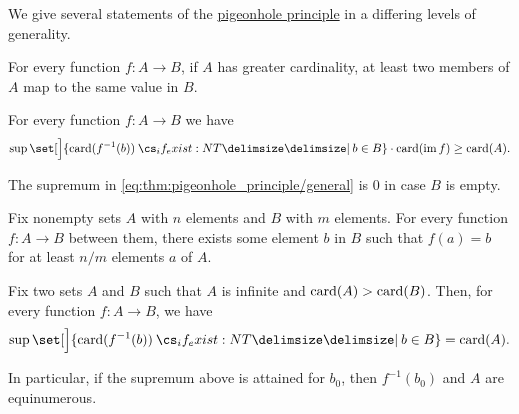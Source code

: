\begin{theorem}\label{thm:pigeonhole_principle}
  We give several statements of the \hyperref[con:pigeonhole_principle]{pigeonhole principle} in a differing levels of generality.

  \begin{thmenum}
     For every function \( f: A \to B \), if \( A \) has greater cardinality, at least two members of \( A \) map to the same value in \( B \).

     For every function \( f: A \to B \) we have
    \begin{equation}\label{eq:thm:pigeonhole_principle/general}
      \sup\set[\Big]{ \card(f^{-1}(b)) \given* b \in B } \cdot \card(\img f) \geq \card(A).
    \end{equation}

    The supremum in \eqref{eq:thm:pigeonhole_principle/general} is \( 0 \) in case \( B \) is empty.

     Fix nonempty  sets \( A \) with \( n \) elements and \( B \) with \( m \) elements. For every function \( f: A \to B \) between them, there exists some element \( b \) in \( B \) such that \( f(a) = b \) for at least \( n / m \) elements \( a \) of \( A \).

     Fix two sets \( A \) and \( B \) such that \( A \) is infinite and \( \operatorname{card}(A) > \operatorname{card}(B) \). Then, for every function \( f: A \to B \), we have
    \begin{equation}\label{eq:thm:pigeonhole_principle/infinitary}
      \sup\set[\Big]{ \card(f^{-1}(b)) \given* b \in B } = \card(A).
    \end{equation}

    In particular, if the supremum above is attained for \( b_0 \), then \( f^{-1}(b_0) \) and \( A \) are equinumerous.
  \end{thmenum}
\end{theorem}
